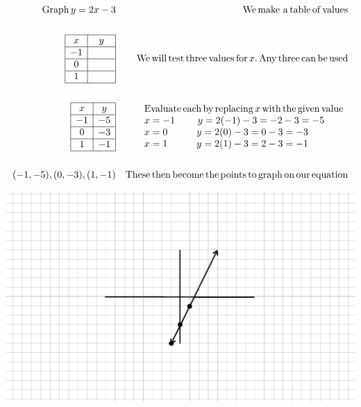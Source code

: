 \begin{example}\label{Lin44}
  \begin{eqnarray*}
    \operatorname{Graph} y = 2 x - 3 &  & \operatorname{We} \operatorname{make~a} \operatorname{table}
    \operatorname{of} \operatorname{values}\\
    &  & \\
    \begin{array}{|c|c|}
      \hline
      x & ~~y~~\\
      \hline
      - 1 & \\
      \hline
      0 & \\
      \hline
      1 & \\
      \hline
    \end{array} &  & \operatorname{We} \operatorname{will} \operatorname{test} \operatorname{three}
    \operatorname{values} \operatorname{for} x. \operatorname{Any} \operatorname{three} \operatorname{can} \operatorname{be}
    \operatorname{used}\\
    &  & \\
    \begin{array}{|c|c|}
      \hline
      x & y\\
      \hline
      - 1 & - 5\\
      \hline
      0 & - 3\\
      \hline
      1 & - 1\\
      \hline
    \end{array} &  & \begin{array}{l}
      \operatorname{Evaluate} \operatorname{each} \operatorname{by} \operatorname{replacing} x \operatorname{with}
      \operatorname{the} \operatorname{given} \operatorname{value}\\
      x = - 1 ~~~~~~~ y = 2 (- 1) - 3 = - 2 - 3 = - 5\\
      x = 0  ~~~~~~~~~y = 2 (0) - 3 = 0 - 3 = - 3\\
      x = 1  ~~~~~~~~~y = 2 (1) - 3 = 2 - 3 = - 1
    \end{array}\\
    &  & \\
    (- 1, - 5), (0, - 3), (1, - 1) &  & \operatorname{These} \operatorname{then} \operatorname{become}
    \operatorname{the} \operatorname{points} \operatorname{to} \operatorname{graph} \operatorname{on} \operatorname{our}
    \operatorname{equation}
  \end{eqnarray*}
  \begin{multicols}{2}
    \includegraphics[scale=.9,bb = 115 65 310 190, clip=true]{II_1_3b-7.eps}
    

\end{multicols}
\end{example}
